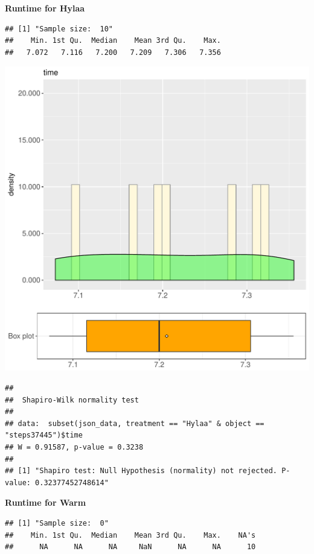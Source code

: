 \documentclass{article}\usepackage[]{graphicx}\usepackage[]{color}
\makeatletter
\def\maxwidth{ %
  \ifdim\Gin@nat@width>\linewidth
    \linewidth
  \else
    \Gin@nat@width
  \fi
}
\newenvironment{kframe}{%
 \def\at@end@of@kframe{}%
 \ifinner\ifhmode%
  \def\at@end@of@kframe{\end{minipage}}%
  \begin{minipage}{\columnwidth}%
 \fi\fi%
 \def\FrameCommand##1{\hskip\@totalleftmargin \hskip-\fboxsep
 \colorbox{shadecolor}{##1}\hskip-\fboxsep
     \hskip-\linewidth \hskip-\@totalleftmargin \hskip\columnwidth}%
 \MakeFramed {\advance\hsize-\width
   \@totalleftmargin\z@ \linewidth\hsize
   \@setminipage}}%
 {\par\unskip\endMakeFramed%
 \at@end@of@kframe}
\newenvironment{knitrout}{}{} %
\makeatother
\begin{document}
 \textbf{Runtime for Hylaa}
\begin{knitrout}
\color{fgcolor}\begin{kframe}
\begin{verbatim}
## [1] "Sample size:  10"
##    Min. 1st Qu.  Median    Mean 3rd Qu.    Max. 
##   7.072   7.116   7.200   7.209   7.306   7.356
\end{verbatim}
\end{kframe}
\includegraphics[width=\maxwidth]{figure/RH1_Hylaa_steps37445-1} 
\begin{kframe}\begin{verbatim}
## 
## 	Shapiro-Wilk normality test
## 
## data:  subset(json_data, treatment == "Hylaa" & object == "steps37445")$time
## W = 0.91587, p-value = 0.3238
## 
## [1] "Shapiro test: Null Hypothesis (normality) not rejected. P-value: 0.32377452748614"
\end{verbatim}
\end{kframe}
\end{knitrout}
 \textbf{Runtime for Warm}
\begin{knitrout}
\color{fgcolor}\begin{kframe}
\begin{verbatim}
## [1] "Sample size:  0"
##    Min. 1st Qu.  Median    Mean 3rd Qu.    Max.    NA's 
##      NA      NA      NA     NaN      NA      NA      10
\end{verbatim}
\end{kframe}
\end{knitrout}
  
\end{document}
